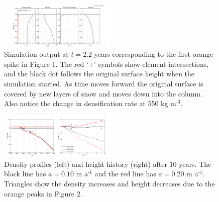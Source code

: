 \documentclass{article}%
\newcommand{\sups}[1]{\ensuremath{^{\textrm{#1}}}}
\begin{document}
\begin{figure}[H]
  \centering
    \includegraphics[width=0.50\textwidth]{images/end.png}
	\caption{\footnotesize Simulation output at $t = 2.2$ years corresponding to the first orange spike in Figure 1.  The red `+' symbols show element intersections, and the black dot follows the original surface height when the simulation started.  As time moves forward the original surface is covered by new layers of snow and moves down into the column.  Also notice the change in densification rate at 550 kg m\sups{-3}.}
\end{figure}

\begin{figure}[H]
  \centering
    \includegraphics[width=0.50\textwidth]{images/density_height.png}
	\caption{\footnotesize Density profiles (left) and height history (right) after 10 years.  The black line has $\dot{a} = 0.10$ m a\sups{-1} and the red line has $\dot{a} = 0.20$ m a\sups{-1}.  Triangles show the density increases and height decreases due to the orange peaks in Figure 2.}
\end{figure}
\end{document}
